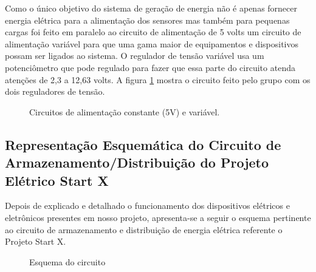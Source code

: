 Como o único objetivo do sistema de geração de energia não é apenas fornecer energia elétrica para a alimentação dos sensores mas também para pequenas cargas foi feito em paralelo ao circuito de alimentação de 5 volts um circuito de alimentação variável para que uma gama maior de equipamentos e dispositivos possam ser ligados ao sistema. O regulador de tensão variável usa um potenciômetro que pode regulado para fazer que essa parte do circuito atenda atenções de 2,3 a 12,63 volts. A figura \ref{circuito-alimentacao} mostra o circuito feito pelo grupo com os dois reguladores de tensão.

\begin{figure}[h]
	\centering
	\caption{Circuitos de alimentação constante (5V) e variável. }
	\label{circuito-alimentacao}
\end{figure}

\subsection{Representação Esquemática do Circuito  de Armazenamento/Distribuição do Projeto Elétrico Start X}

Depois de explicado e detalhado o funcionamento dos dispositivos elétricos e eletrônicos presentes em nosso projeto, apresenta-se a seguir o esquema pertinente ao circuito de armazenamento e distribuição de energia elétrica referente o Projeto Start X. 

\begin{figure}[h]
	\centering
	\caption{Esquema do circuito}
	\label{ciruito}
\end{figure}
